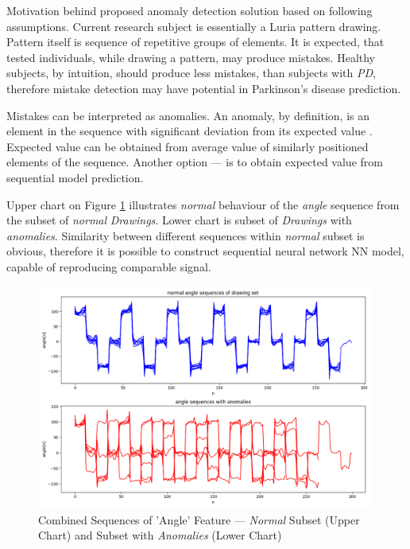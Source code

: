 Motivation behind proposed anomaly detection solution based on following assumptions. Current research subject is essentially a Luria pattern drawing. Pattern itself is sequence of repetitive groups of elements. It is expected, that tested individuals, while drawing a pattern, may produce mistakes. Healthy subjects, by intuition, should produce less mistakes, than subjects with \textit{PD}, therefore mistake detection may have potential in Parkinson's disease prediction.

Mistakes can be interpreted as anomalies. An anomaly, by definition, is an element in the sequence with significant deviation from its expected value \cite{chandola2009anomaly}. Expected value can be obtained from average value of similarly positioned elements of the sequence. Another option --- is to obtain expected value from sequential model prediction. 

Upper chart on Figure \ref{sequence-angle} illustrates \textit{normal} behaviour of the \textit{angle} sequence from the subset of \textit{normal} \textit{Drawings}. Lower chart is subset of \textit{Drawings} with \textit{anomalies}. Similarity between different sequences within  \textit{normal} subset is obvious, therefore it is possible to construct sequential neural network NN model, capable of reproducing comparable signal.

\begin{figure}[htb]
  \centering
    \includegraphics[width=0.99\textwidth]
        {images/anomaly/sequence-angle}
    \caption{Combined Sequences of 'Angle' Feature --- \textit{Normal} Subset (Upper Chart) and Subset with \textit{Anomalies} (Lower Chart)}
    \label{sequence-angle}
\end{figure}

